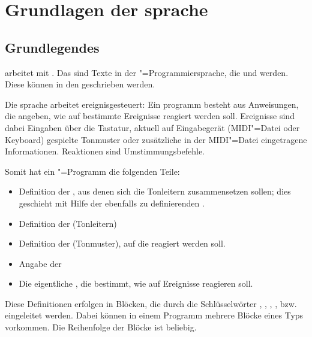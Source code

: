 \part{Grundlagen der 
\texorpdfstring{\mutabor{}}{Mutabor}sprache}
\label{sec:SX_BASICS}

\chapter{Grundlegendes}

\mutabor{} arbeitet mit
. Das sind Texte in der
\mutabor{}"=Programmiersprache, die
 und
 werden. Diese
 können in den
 geschrieben werden.

Die \mutabor{}sprache arbeitet ereignisgesteuert: Ein
\mutabor{}programm besteht aus Anweisungen, die angeben, wie auf
bestimmte Ereignisse reagiert werden soll. Ereignisse sind dabei
Eingaben über die Tastatur, aktuell auf Eingabegerät (MIDI"=Datei oder
Keyboard) gespielte Tonmuster oder zusätzliche in der MIDI"=Datei
eingetragene Informationen. Reaktionen sind Umstimmungsbefehle.

Somit hat ein \mutabor{}"=Programm die folgenden Teile:

\begin{itemize}
\item Definition der , aus denen sich die
  Tonleitern zusammensetzen sollen; dies geschieht mit Hilfe der
  ebenfalls zu definierenden .
\item Definition der 
  (Tonleitern)
\item Definition der  (Tonmuster),
  auf die reagiert werden soll.
\item Angabe der 
\item Die eigentliche , die
  bestimmt, wie \mutabor{} auf Ereignisse reagieren soll.
\end{itemize}


Diese Definitionen erfolgen in Blöcken, die durch die Schlüsselwörter
, , ,
,  bzw.  
eingeleitet werden. Dabei können in einem Programm mehrere Blöcke
eines Typs vorkommen. Die Reihenfolge der Blöcke ist beliebig.

